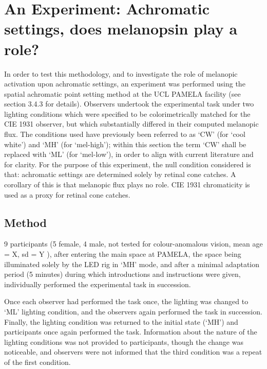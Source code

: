\section{An Experiment: Achromatic settings, does melanopsin play a role?}

In order to test this methodology, and to investigate the role of melanopic activation upon achromatic settings, an experiment was performed using the spatial achromatic point setting method at the UCL PAMELA facility (see section 3.4.3 for details). Observers undertook the experimental task under two lighting conditions which were specified to be colorimetrically matched for the CIE 1931 observer, but which substantially differed in their computed melanopic flux. The conditions used have previously been referred to as `CW' (for `cool white') and `MH' (for `mel-high'); within this section the term `CW' shall be replaced with `ML' (for `mel-low'), in order to align with current literature and for clarity.
For the purpose of this experiment, the null condition considered is that: achromatic settings are determined solely by retinal cone catches. A corollary of this is that melanopic flux plays no role. CIE 1931 chromaticity is used as a proxy for retinal cone catches.




\subsection{Method}

9 participants (5 female, 4 male, not tested for colour-anomalous vision, mean age = X, sd = Y ), after entering the main space at PAMELA, the space being illuminated solely by the LED rig in `MH' mode, and after a minimal adaptation period (5 minutes) during which introductions and instructions were given, individually performed the experimental task in succession. 

Once each observer had performed the task once, the lighting was changed to `ML' lighting condition, and the observers again performed the task in succession. Finally, the lighting condition was returned to the initial state (`MH') and participants once again performed the task. Information about the nature of the lighting conditions was not provided to participants, though the change was noticeable, and observers were not informed that the third condition was a repeat of the first condition. 

